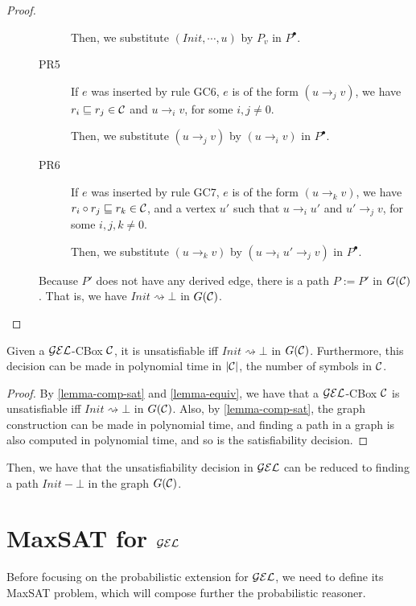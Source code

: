 \begin{proof}
\begin{description}
\begin{description}
        Then, we substitute $(Init, \cdots, u)$ by $P_v$ in $P^\bullet$.
        
        \item[PR5] If $e$ was inserted by rule GC6, $e$ is of the form $(u \to_j v)$, we have $r_i \sqsubseteq r_j \in \mathcal{C}$ and $u \to_i v$, for some $i,j \neq 0$.
        
        Then, we substitute $(u \to_j v)$ by $(u \to_i v)$ in $P^\bullet$.
        
        \item[PR6] If $e$ was inserted by rule GC7, $e$ is of the form $(u \to_k v)$, we have $r_i \circ r_j \sqsubseteq r_k \in \mathcal{C}$, and a vertex $u'$ such that $u \to_i u'$ and $u' \to_j v$, for some $i,j,k \neq 0$.
        
        Then, we substitute $(u \to_k v)$ by $(u \to_i u' \to_j v)$ in $P^\bullet$.
    \end{description}
    Because $P'$ does not have any derived edge, there is a path $P := P'$ in $G(\mathcal{C})$. That is, we have $Init \rightsquigarrow \bot$ in $G(\mathcal{C})$.
\end{description}
\end{proof}

\begin{theorem}
	\label{theorem:gel-sat}
Given a $\mathcal{GEL}$-CBox $\mathcal{C}$, it is unsatisfiable iff $Init \rightsquigarrow \bot$ in $G(\mathcal{C})$. Furthermore, this decision can be made in polynomial time in $|\mathcal{C}|$, the number of symbols in $\mathcal{C}$.
\end{theorem}
\begin{proof}
    By \autoref{lemma-comp-sat} and \autoref{lemma-equiv}, we have that a $\mathcal{GEL}$-CBox $\mathcal{C}$ is unsatisfiable iff $Init \rightsquigarrow \bot$ in $G(\mathcal{C})$. Also, by \autoref{lemma-comp-sat}, the graph construction can be made in polynomial time, and finding a path in a graph is also computed in polynomial time, and so is the satisfiability decision. 
\end{proof}

Then, we have that the unsatisfiability decision in $\mathcal{GEL}$ can be reduced to finding a path $Init-\bot$ in the graph $G(\mathcal{C})$.

\section{MaxSAT for \texorpdfstring{$\mathcal{GEL}$}{GEL}}
\label{sec:maxgel}

Before focusing on the probabilistic extension for $\mathcal{GEL}$, we need to define its MaxSAT problem, which will compose further the probabilistic reasoner.

